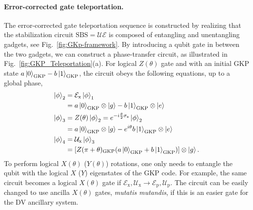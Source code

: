 \documentclass[aps,prx,showpacs,notitlepage,twocolumn,superscriptaddress,nofootinbib,preprintnumbers,floatfix,10pt, longbibliography]{revtex4-2}
\begin{document}
\paragraph{Error-corrected gate teleportation.}
The error-corrected gate teleportation sequence is constructed by realizing that the stabilization circuit $\mathrm{SBS}=\mathcal{U}\mathcal{E}$ is composed of entangling and unentangling gadgets, see Fig.~\ref{fig:GKp-framework}. By introducing a qubit gate in between the two gadgets, we can construct a phase-transfer circuit, as illustrated in Fig.~\ref{fig:GKP_Teleportation}(a). For logical $Z(\theta)$ gate and with an initial GKP state $a\ket{0}_\mathrm{GKP}-b\ket{1}_\mathrm{GKP}$, the circuit obeys the following equations, up to a global phase,
\begin{align}
\ket{\phi}_2&=\mathcal{E}_\mathrm{x}\ket{\phi}_1\nonumber\\
  &=a\ket{0}_\mathrm{GKP}\otimes\ket{g}-b\ket{1}_\mathrm{GKP}\otimes\ket{e}\\
  \ket{\phi}_3&=Z(\theta)\ket{\phi}_2=e^{-i\frac{\theta}{2} \sigma_\mathrm{z}}\ket{\phi}_2\nonumber\\
  &=a\ket{0}_\mathrm{GKP}\otimes\ket{g}-e^{i\theta}b\ket{1}_\mathrm{GKP}\otimes\ket{e}\\
  \ket{\phi}_4&=\mathcal{U}_\mathrm{x}\ket{\phi}_3\nonumber\\
  &=[Z(\pi+\theta)_\mathrm{GKP}(a\ket{0}_\mathrm{GKP}+b\ket{1}_\mathrm{GKP})]\otimes\ket{g}.
\end{align}
To perform logical $X(\theta)$ ($Y(\theta)$) rotations, one only needs to entangle the qubit with the logical $X$ ($Y$) eigenstates of the GKP code. 
For example, the same circuit becomes a logical $X(\theta)$ gate if $\mathcal{E}_\mathrm{x},\mathcal{U}_\mathrm{x}\rightarrow \mathcal{E}_\mathrm{p},\mathcal{U}_\mathrm{p}$. 
The circuit can be easily changed to use ancilla $X(\theta)$ gates, \textit{mutatis mutandis}, if this is an easier gate for the DV ancillary system. 
\end{document}
